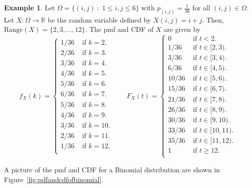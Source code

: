\documentclass[preprint,  11pt]{amsart}
\theoremstyle{plain} %
\theoremstyle{definition} %
\newtheorem{example}[theorem]{Example}
\begin{document}
\begin{example} Let $\Omega=\{(i,j){\; : \;} 1\le i,j\le 6\}$ with $p_{(i,j)}=\frac{1}{36}$ for all $(i,j)\in \Omega$. Let $X:\Omega \rightarrow \mathbb{R}$ be the random variable defined by $X(i,j)=i+j$. Then, $\mbox{Range}(X)=\{2,3,\ldots ,12\}$. The pmf and CDF of $X$ are given by
$$
f_{X}(k) = \begin{cases} 
1/36 & \mbox{ if }k=2. \\
2/36 & \mbox{ if }k=3. \\
3/36 & \mbox{ if }k=4. \\
4/36 & \mbox{ if }k=5. \\
5/36 & \mbox{ if }k=6. \\
6/36 & \mbox{ if }k=7. \\
5/36 & \mbox{ if }k=8. \\
4/36 & \mbox{ if }k=9. \\
3/36 & \mbox{ if }k=10. \\
2/36 & \mbox{ if }k=11. \\
1/36 & \mbox{ if }k=12. \\
\end{cases}
\qquad
F_{X}(t) = \begin{cases} 
0 & \mbox{ if }t<2. \\
1/36 & \mbox{ if }t\in[2,3). \\
3/36 & \mbox{ if }t\in[3,4). \\
6/36 & \mbox{ if }t\in[4,5). \\
10/36 & \mbox{ if }t\in[5,6). \\
15/36 & \mbox{ if }t\in[6,7). \\
21/36 & \mbox{ if }t\in[7,8). \\
26/36 & \mbox{ if }t\in[8,9). \\
30/36 & \mbox{ if }t\in[9,10). \\
33/36 & \mbox{ if }t\in[10,11). \\
35/36 & \mbox{ if }t\in[11,12). \\
1 & \mbox{ if }t\ge 12. \\
\end{cases}
$$
\end{example}
A picture of the pmf and CDF for a Binomial distribution are shown in Figure~\ref{fig:pdfandcdfofbinomial}.
\end{document}

